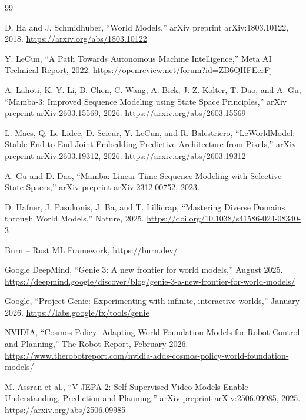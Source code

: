 \documentclass[11pt,a4paper]{ltjsarticle}
\begin{document}
\newpage

\begin{thebibliography}{99}

D. Ha and J. Schmidhuber,
``World Models,''
arXiv preprint arXiv:1803.10122, 2018.
\url{https://arxiv.org/abs/1803.10122}

Y. LeCun,
``A Path Towards Autonomous Machine Intelligence,''
Meta AI Technical Report, 2022.
\url{https://openreview.net/forum?id=ZB6QHFEerFj}

A. Lahoti, K. Y. Li, B. Chen, C. Wang, A. Bick, J. Z. Kolter, T. Dao, and A. Gu,
``Mamba-3: Improved Sequence Modeling using State Space Principles,''
arXiv preprint arXiv:2603.15569, 2026.
\url{https://arxiv.org/abs/2603.15569}

L. Maes, Q. Le Lidec, D. Scieur, Y. LeCun, and R. Balestriero,
``LeWorldModel: Stable End-to-End Joint-Embedding Predictive Architecture from Pixels,''
arXiv preprint arXiv:2603.19312, 2026.
\url{https://arxiv.org/abs/2603.19312}

A. Gu and D. Dao,
``Mamba: Linear-Time Sequence Modeling with Selective State Spaces,''
arXiv preprint arXiv:2312.00752, 2023.

D. Hafner, J. Pasukonis, J. Ba, and T. Lillicrap,
``Mastering Diverse Domains through World Models,''
Nature, 2025.
\url{https://doi.org/10.1038/s41586-024-08340-3}

Burn -- Rust ML Framework,
\url{https://burn.dev/}

Google DeepMind,
``Genie 3: A new frontier for world models,''
August 2025.
\url{https://deepmind.google/discover/blog/genie-3-a-new-frontier-for-world-models/}

Google,
``Project Genie: Experimenting with infinite, interactive worlds,''
January 2026.
\url{https://labs.google/fx/tools/genie}

NVIDIA,
``Cosmos Policy: Adapting World Foundation Models for Robot Control and Planning,''
The Robot Report, February 2026.
\url{https://www.therobotreport.com/nvidia-adds-cosmos-policy-world-foundation-models/}

M. Assran et al.,
``V-JEPA 2: Self-Supervised Video Models Enable Understanding, Prediction and Planning,''
arXiv preprint arXiv:2506.09985, 2025.
\url{https://arxiv.org/abs/2506.09985}


\end{thebibliography}
\end{document}
